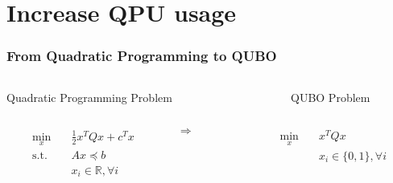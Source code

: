 \documentclass[aspectratio=169]{beamer}
\begin{document}
\section{Increase QPU usage}

\begin{frame}
    \frametitle{From Quadratic Programming to QUBO}

    \begin{columns}
        \begin{column}{0.4\textwidth}
            \centering
            Quadratic Programming Problem
        \end{column}
        \begin{column}{0.1\textwidth}
        \end{column}
        \begin{column}{0.4\textwidth}
            \centering
            QUBO Problem
        \end{column}
    \end{columns}
    \vspace{0.5cm}
    \begin{columns}
        \begin{column}{0.4\textwidth}
            \begin{equation*}
                \begin{aligned}
                    \min_{x} \quad & \frac{1}{2}x^TQx + c^Tx\\
                    \textrm{s.t.} \quad & Ax \preceq b\\
                    &x_i\in \mathbb{R}, \forall i    \\
                \end{aligned}
            \end{equation*}        
        \end{column}
        \begin{column}{0.1\textwidth}
            \LARGE
            $\Longrightarrow$
        \end{column}
        \begin{column}{0.4\textwidth}
            \begin{equation*}
                \begin{aligned}
                    \min_{x} \quad & x^TQx\\
                    &x_i\in\{0, 1\}, \forall i    \\
                \end{aligned}
            \end{equation*}  
        \end{column}
    \end{columns}

\end{frame}
\end{document}
